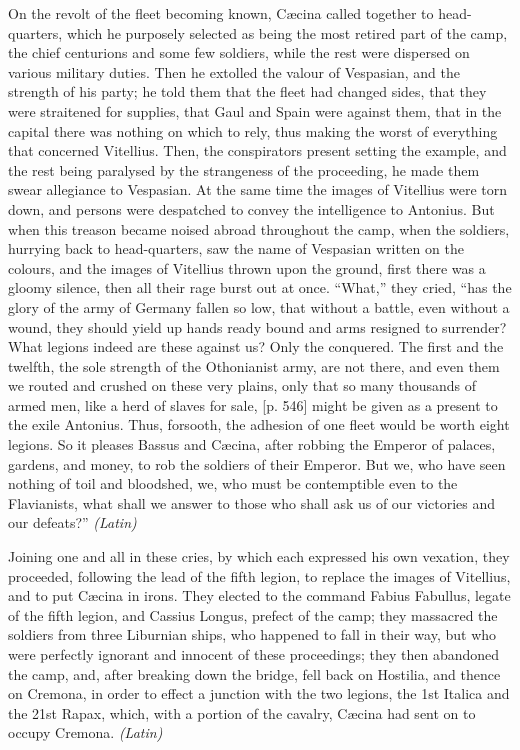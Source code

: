 
On the revolt of the fleet becoming known, Cæcina called together to head-quarters, which he purposely selected as being the most retired part of the camp, the chief centurions and some few soldiers, while the rest were dispersed on various military duties. Then he extolled the valour of Vespasian, and the strength of his party; he told them that the fleet had changed sides, that they were straitened for supplies, that Gaul and Spain were against them, that in the capital there was nothing on which to rely, thus making the worst of everything that concerned Vitellius. Then, the conspirators present setting the example, and the rest being paralysed by the strangeness of the proceeding, he made them swear allegiance to Vespasian. At the same time the images of Vitellius were torn down, and persons were despatched to convey the intelligence to Antonius. But when this treason became noised abroad throughout the camp, when the soldiers, hurrying back to head-quarters, saw the name of Vespasian written on the colours, and the images of Vitellius thrown upon the ground, first there was a gloomy silence, then all their rage burst out at once. ``What,'' they cried, ``has the glory of the army of Germany fallen so low, that without a battle, even without a wound, they should yield up hands ready bound and arms resigned to surrender? What legions indeed are these against us? Only the conquered. The first and the twelfth, the sole strength of the Othonianist army, are not there, and even them we routed and crushed on these very plains, only that so many thousands of armed men, like a herd of slaves for sale, [p. 546] might be given as a present to the exile Antonius. Thus, forsooth, the adhesion of one fleet would be worth eight legions. So it pleases Bassus and Cæcina, after robbing the Emperor of palaces, gardens, and money, to rob the soldiers of their Emperor. But we, who have seen nothing of toil and bloodshed, we, who must be contemptible even to the Flavianists, what shall we answer to those who shall ask us of our victories and our defeats?'' \emph{(Latin)}


Joining one and all in these cries, by which each expressed his own vexation, they proceeded, following the lead of the fifth legion, to replace the images of Vitellius, and to put Cæcina in irons. They elected to the command Fabius Fabullus, legate of the fifth legion, and Cassius Longus, prefect of the camp; they massacred the soldiers from three Liburnian ships, who happened to fall in their way, but who were perfectly ignorant and innocent of these proceedings; they then abandoned the camp, and, after breaking down the bridge, fell back on Hostilia, and thence on Cremona, in order to effect a junction with the two legions, the 1st Italica and the 21st Rapax, which, with a portion of the cavalry, Cæcina had sent on to occupy Cremona. \emph{(Latin)}

